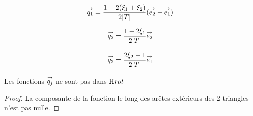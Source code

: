      
      \begin{minipage}{\textwidth}
        \begin{minipage}{0.329\textwidth}
            \begin{center}
              \begin{tikzpicture}[scale=1]
                
              \end{tikzpicture}
            \end{center}
            \begin{equation*}
              \vect{q_1}=\frac{1-2(\xi_1+\xi_2)}{2|T|}(\vect{e_2}-\vect{e_1})
            \end{equation*}
        \end{minipage}
        \begin{minipage}{0.329\textwidth}
            \begin{center}
              \begin{tikzpicture}[scale=1]
                
              \end{tikzpicture}
               \begin{equation*}
                \vect{q_2}=\frac{1-2\xi_1}{2|T|}\vect{e_2}
              \end{equation*}
            \end{center}
        \end{minipage}
        \begin{minipage}{0.329\textwidth}
            \begin{center}
              \begin{tikzpicture}[scale=1]
                
              \end{tikzpicture}
              \begin{equation*}
                \vect{q_3}=\frac{2\xi_2-1}{2|T|}\vect{e_1}
              \end{equation*}
            \end{center}
        \end{minipage}
        \label{fig:form_int:fon_base:q}
      \end{minipage}

      \begin{prop}
        Les fonctions \(\qj\) ne sont pas dans \(\Hrot\)
      \end{prop}
      \begin{proof}
        La composante de la fonction le long des arêtes extérieurs des 2 triangles n'est pas nulle.
      \end{proof}

